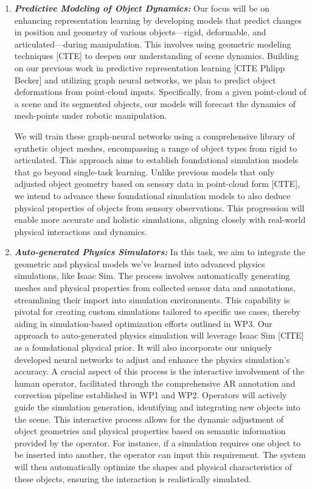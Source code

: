\documentclass{erc-B2}
\begin{document}
\begin{enumerate}
\item \textit{\textbf{Predictive Modeling of Object Dynamics:}} Our focus will be on enhancing representation learning by developing models that predict changes in position and geometry of various objects—rigid, deformable, and articulated—during manipulation. This involves using geometric modeling techniques [CITE] to deepen our understanding of scene dynamics. Building on our previous work in predictive representation learning [CITE Phlipp Becker] and utilizing graph neural networks, we plan to predict object deformations from point-cloud inputs. Specifically, from a given point-cloud of a scene and its segmented objects, our models will forecast the dynamics of mesh-points under robotic manipulation.

We will train these graph-neural networks using a comprehensive library of synthetic object meshes, encompassing a range of object types from rigid to articulated. This approach aims to establish foundational simulation models that go beyond single-task learning. Unlike previous models that only adjusted object geometry based on sensory data in point-cloud form [CITE], we intend to advance these foundational simulation models to also deduce physical properties of objects from sensory observations. This progression will enable more accurate and holistic simulations, aligning closely with real-world physical interactions and dynamics.
\item  \textit{\textbf{ Auto-generated Physics Simulators:}} In this task, we aim to integrate the geometric and physical models we've learned into advanced physics simulations, like Isaac Sim. The process involves automatically generating meshes and physical properties from collected sensor data and annotations, streamlining their import into simulation environments. This capability is pivotal for creating custom simulations tailored to specific use cases, thereby aiding in simulation-based optimization efforts outlined in WP3.
Our approach to auto-generated physics simulation will leverage Isaac Sim [CITE] as a foundational physical prior. It will also incorporate our uniquely developed neural networks to adjust and enhance the physics simulation's accuracy. A crucial aspect of this process is the interactive involvement of the human operator, facilitated through the comprehensive AR annotation and correction pipeline established in WP1 and WP2. Operators will actively guide the simulation generation, identifying and integrating new objects into the scene. This interactive process allows for the dynamic adjustment of object geometries and physical properties based on semantic information provided by the operator.
For instance, if a simulation requires one object to be inserted into another, the operator can input this requirement. The system will then automatically optimize the shapes and physical characteristics of these objects, ensuring the interaction is realistically simulated. 
\end{enumerate}
\end{document}

